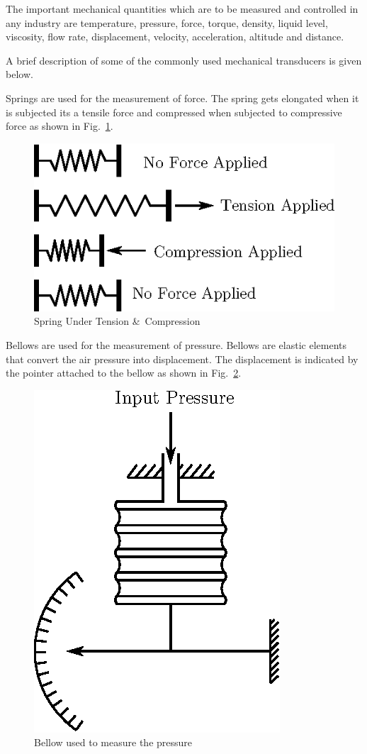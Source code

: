The important mechanical quantities which are to be measured and controlled in any industry are temperature, pressure, force, torque, density, liquid level, viscosity, flow rate, displacement, velocity, acceleration, altitude and distance.

A brief description of some of the commonly used mechanical transducers is given below.

\smallskip

 Springs are used for the measurement of force. The spring gets elongated when it is subjected its a tensile force and compressed when subjected to compressive force as shown in Fig.~\ref{fig8.2}.
\begin{figure}[H]
\centering
\includegraphics[scale=.86]{chap8/fig8.2.eps}
\caption{Spring Under Tension \&\ Compression}\label{fig8.2}
\end{figure}

 Bellows are used for the measurement of pressure. Bellows are elastic elements that convert the air pressure into displacement. The displacement is indicated by the pointer attached to the bellow as shown in Fig.~\ref{fig8.3}.
\begin{figure}[H]
\centering
\includegraphics[scale=.86]{chap8/fig8.3.eps}
\caption{Bellow used to measure the pressure}\label{fig8.3}
\end{figure}


